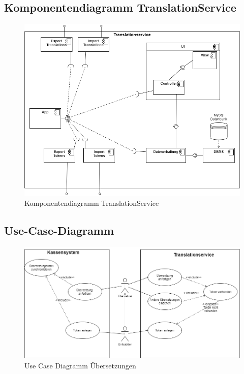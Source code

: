 \documentclass[10pt, oneside, ngerman]{article}
\begin{document}
\subsection{Komponentendiagramm TranslationService}\label{sec:is:comp}
\begin{figure}[htb]
  \centering
  \includegraphics[width=\textwidth]{KomponentenDiagramm.png}
  \caption{Komponentendiagramm TranslationService}
\end{figure}
\newpage
\subsection{Use-Case-Diagramm}\label{sec:uml:uscas}
\begin{figure}[htb]
  \centering
  \includegraphics[width=\textwidth]{Use-Case-Diagramm.png}
  \caption{Use Case Diagramm Übersetzungen}
\end{figure}
\newpage
\end{document}
